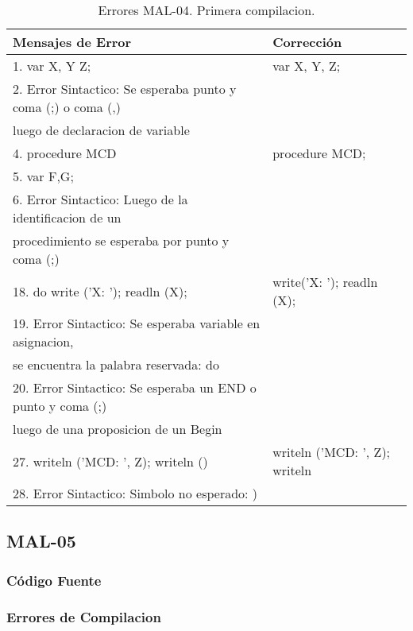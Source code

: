 \documentclass[a4paper,12pt]{article}
\begin{document}
\begin{table}[h!]
\centering
\begin{tabular}{|l|l|}
\hline
Mensajes de Error & Corrección\\
\hline
1. var X, Y Z;												&var X, Y, Z;\\
2. Error Sintactico: Se esperaba punto y coma (;) o coma (,) 	&\\
luego de declaracion de variable								&\\
\hline
4. procedure MCD												& procedure MCD;\\
5. var F,G;													&\\
6. Error Sintactico: Luego de la identificacion de un 		&\\
procedimiento se esperaba por punto y coma (;)				&\\
\hline
18. do write ('X: '); readln (X);							& write('X: '); readln (X);\\
19. Error Sintactico: Se esperaba variable en asignacion, 	&\\
se encuentra la palabra reservada: do						&\\
20. Error Sintactico: Se esperaba un END o punto y coma (;) 	&\\
luego de una proposicion de un Begin							&\\
\hline
27. writeln ('MCD: ', Z); writeln ()							&writeln ('MCD: ', Z); writeln\\
28. Error Sintactico: Simbolo no esperado: ) 				&\\
\hline
\end{tabular}
\caption{Errores MAL-04. Primera compilacion.}
\label{MAL-04-1}
\end{table}

\subsection{MAL-05}
\subsubsection{Código Fuente}

\subsubsection{Errores de Compilacion}
\end{document}

